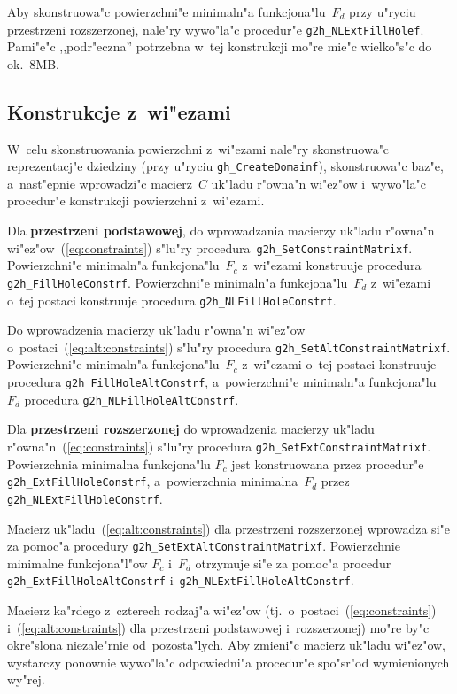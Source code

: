 Aby skonstruowa"c powierzchni"e minimaln"a funkcjona"lu~$F_d$
przy u"ryciu przes\-trze\-ni rozszerzonej, nale"ry wywo"la"c procedur"e
\texttt{g2h\_NLExtFillHolef}. Pami"e"c ,,podr"eczna'' potrzebna w~tej
konstrukcji mo"re mie"c wielko"s"c do ok.\ $8$MB.


\subsection{\label{ssect:g2h:constraints}Konstrukcje z~wi"ezami}

W~celu skonstruowania powierzchni z~wi"ezami nale"ry skonstruowa"c
reprezentacj"e dziedziny (przy u"ryciu \texttt{gh\_CreateDomainf}),
skonstruowa"c baz"e, a~nast"epnie wprowadzi"c macierz~$C$ uk"ladu r"owna"n
wi"ez"ow i~wywo"la"c procedur"e konstrukcji powierzchni z~wi"ezami.

\begin{sloppypar}
Dla \textbf{przestrzeni podstawowej}, do wprowadzania macierzy uk"ladu r"owna"n
wi"ez"ow~(\ref{eq:constraints}) s"lu"ry
procedura~\texttt{g2h\_SetConstraintMatrixf}. Powierzchni"e minimaln"a
funkcjona"lu~$F_c$ z~wi"ezami konstruuje procedura
\texttt{g2h\_FillHoleConstrf}. Powierzchni"e minimaln"a funkcjona"lu~$F_d$
z~wi"ezami o~tej postaci konstruuje procedura \texttt{g2h\_NLFillHoleConstrf}.%
\end{sloppypar}

Do wprowadzenia macierzy uk"ladu r"owna"n wi"ez"ow
o~postaci~(\ref{eq:alt:constraints})
s"lu"ry procedura \texttt{g2h\_SetAltConstraintMatrixf}. Powierzchni"e
minimaln"a funkcjona"lu~$F_c$ z~wi"ezami o~tej postaci konstruuje procedura
\texttt{g2h\_FillHoleAltConstrf}, a~powierzchni"e minimaln"a
funkcjona"lu~$F_d$ procedura \texttt{g2h\_NLFillHoleAltConstrf}.

Dla \textbf{przestrzeni rozszerzonej} do wprowadzenia macierzy uk"ladu
r"owna"n~(\ref{eq:constraints}) s"lu"ry procedura
\texttt{g2h\_SetExtConstraintMatrixf}. Powierzchnia minimalna funkcjona"lu
$F_c$ jest konstruowana przez procedur"e
\texttt{g2h\_ExtFillHoleConstrf}, a~powierzchnia minimalna~$F_d$ przez
\texttt{g2h\_NLExtFillHoleConstrf}.

Macierz uk"ladu~(\ref{eq:alt:constraints}) dla przestrzeni rozszerzonej
wprowadza si"e za pomoc"a procedury
\texttt{g2h\_SetExtAltConstraintMatrixf}. Powierzchnie minimalne
funkcjona"l"ow $F_c$ i~$F_d$ otrzymuje si"e za pomoc"a procedur
\texttt{g2h\_ExtFillHoleAltConstrf} i~\texttt{g2h\_NLExtFillHoleAltConstrf}.

Macierz ka"rdego z~czterech rodzaj"a wi"ez"ow
(tj.\ o~postaci~(\ref{eq:constraints}) i~(\ref{eq:alt:constraints}) dla
przestrzeni podstawowej i~rozszerzonej) mo"re by"c okre"slona niezale"rnie
od~pozosta"lych. Aby zmieni"c macierz uk"ladu wi"ez"ow, wystarczy ponownie
wywo"la"c odpowiedni"a procedur"e spo"sr"od wymienionych wy"rej.


